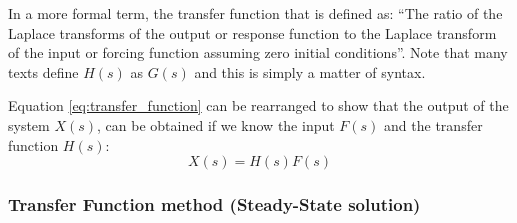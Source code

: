 \documentclass[12pt,letter]{article}
\begin{document}
In a more formal term, the transfer function that is defined as: ``The ratio of the Laplace transforms of the output or response function to the Laplace transform of the input or forcing function assuming zero initial conditions''. Note that many texts define $H(s)$ as $G(s)$ and this is simply a matter of syntax. 

Equation \ref{eq:transfer_function} can be rearranged to show that the output of the system $X(s)$, can be obtained if we know the input $F(s)$ and the transfer function $H(s)$:
\begin{equation}
 X(s) = H(s)F(s)
\end{equation}	


\subsubsection{Transfer Function method (Steady-State solution)}
\end{document}
